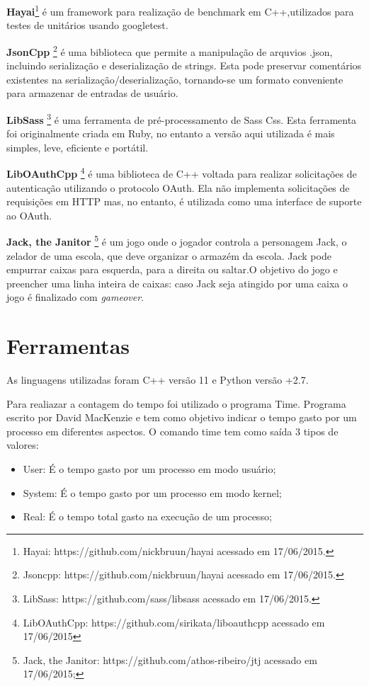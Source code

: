 \textbf{Hayai}\footnote{Hayai: https://github.com/nickbruun/hayai acessado em
 17/06/2015.} é um framework para realização de benchmark em C++,utilizados
 para testes de unitários usando googletest.

\textbf{JsonCpp} \footnote{Jsoncpp: https://github.com/nickbruun/hayai acessado
 em 17/06/2015. } é uma biblioteca que permite a manipulação de arquvios .json,
 incluindo serialização e deserialização de strings. Esta pode preservar
 comentários existentes na serialização/deserialização, tornando-se um formato
 conveniente para armazenar de entradas de usuário.

\textbf{LibSass} \footnote{LibSass: https://github.com/sass/libsass acessado
 em 17/06/2015.} é uma ferramenta de pré-processamento de Sass Css. Esta
 ferramenta foi originalmente criada em Ruby, no entanto a versão aqui utilizada
 é mais simples, leve, eficiente e portátil.

\textbf{LibOAuthCpp} \footnote{LibOAuthCpp: https://github.com/sirikata/liboauthcpp
 acessado em 17/06/2015} é uma biblioteca de C++ voltada para realizar solicitações
 de autenticação utilizando o protocolo OAuth. Ela não implementa solicitações de
 requisições em HTTP mas, no entanto, é utilizada como uma interface de suporte ao
 OAuth.

\textbf{Jack, the Janitor} \footnote{Jack, the Janitor: https://github.com/athos-ribeiro/jtj
 acessado em 17/06/2015;} é um jogo onde o jogador controla  a personagem Jack,
 o zelador de uma escola, que deve organizar o armazém da escola. Jack pode empurrar
 caixas para esquerda, para a direita ou saltar.O objetivo do jogo e preencher uma
 linha inteira de caixas: caso Jack seja atingido por uma caixa o jogo é finalizado
 com \textit{gameover}.

\section{Ferramentas}

As linguagens utilizadas foram C++ versão 11 e Python versão +2.7.

Para realiazar a contagem do tempo foi utilizado o programa Time.
 Programa escrito por David MacKenzie e tem como objetivo indicar o tempo gasto
 por um processo em diferentes aspectos.
 O comando time tem como saída 3 tipos de valores:

\begin{itemize}
	\item User: É o tempo gasto por um processo em modo usuário;
	\item System:  É o tempo gasto por um processo em modo kernel;
	\item Real:  É o tempo total gasto na execução de um processo;
\end{itemize}

